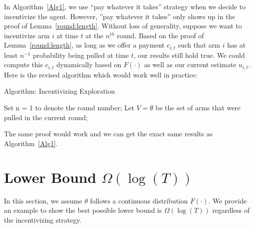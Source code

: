 \documentclass[twoside,11pt]{article}
\begin{document}
In Algorithm~\ref{Alg1}, we use ``pay whatever it takes'' strategy when we decide to incentivize the agent. However, ''pay whatever it takes'' only shows up in the proof of Lemma~\ref{round:length}. Without loss of generality, suppose we want to incentivize arm $i$ at time $t$ at the $n^{th}$ round. Based on the proof of Lemma~\ref{round:length}, as long as we offer a payment $c_{i,t}$ such that arm $i$ has at least $n^{-1}$ probability being pulled at time $t$, our results still hold true. We could compute this $c_{i,t}$ dynamically based on $F(\cdot)$ as well as our current estimate $u_{i,t}$. Here is the revised algorithm which would work well in practice:


\begin{algorithm}
\caption{Algorithm: Incentivizing Exploration}
\label{Alg2}
\begin{algorithmic}
\STATE Set n = 1 to denote the round number; Let $V=\emptyset$ be the set of arms that were pulled in the current round;
\ENDFOR

\end{algorithmic}
\end{algorithm}


The same proof would work and we can get the exact same results as Algorithm~\ref{Alg1}. 

\section{Lower Bound $\Omega(\log(T))$}
\label{sec:lb}

In this section, we assume $\theta$ follows a continuous distribution $F(\cdot)$. We provide an example to show the best possible lower bound is $\Omega(\log(T))$ regardless of the incentivizing strategy.
\end{document}
